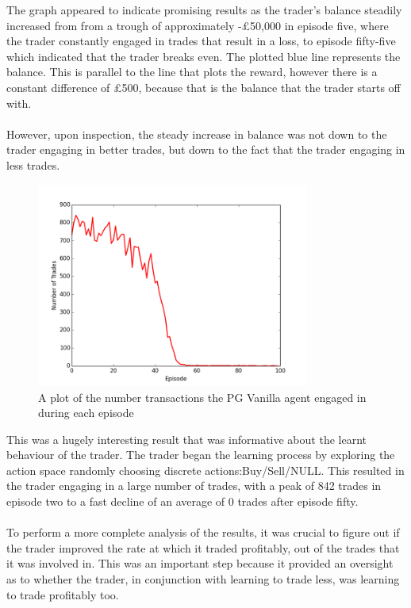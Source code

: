 \documentclass[ %
                    author={Ashwinder Khurana},
                supervisor={Prof Dave Cliff},
                    degree={MEng},
                     title={The Deeply Reinforced Trader},
                  subtitle={},
                      type={enterprise},
                      year={2020} ]{dissertation}
\begin{document}
{The graph appeared to indicate promising results as the trader's balance steadily increased from from a trough of approximately -£50,000 in episode five, where the trader constantly engaged in trades that result in a loss, to episode fifty-five which indicated that the trader breaks even. The plotted blue line represents the balance. This is parallel to the line that plots the reward, however there is a constant difference of £500, because that is the balance that the trader starts off with. 
\\
\\
However, upon inspection, the steady increase in balance was not down to the trader engaging in better trades, but down to the fact that the trader engaging in less trades. 

\begin{figure}[H] 
	\centering
  	\includegraphics[width=0.8\textwidth]{PG-Vanilla-Num-Trades.png}
  	\caption{A plot of the number transactions the PG Vanilla agent engaged in during each episode }
	\label{fig:PG-Vanilla-Num-Trades}  
\end{figure}

\noindent
This was a hugely interesting result that was informative about the learnt behaviour of the trader. The trader began the learning process by exploring the action space randomly choosing discrete actions:Buy/Sell/NULL. This resulted in the trader engaging in a large number of trades, with a peak of 842 trades in episode two to a fast decline of an average of 0 trades after episode fifty. 
\\
\\
\noindent
To perform a more complete analysis of the results, it was crucial to figure out if the trader improved the rate at which it traded profitably, out of the trades that it was involved in. This was an important step because it provided an oversight as to whether the trader, in conjunction with learning to trade less, was learning to trade profitably too.

}
\end{document}
